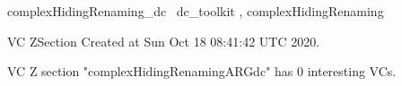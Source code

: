\documentclass{article}
\begin{document}

\begin{zsection}	 \SECTION complexHidingRenaming\_dc \parents~dc\_toolkit , complexHidingRenaming
\end{zsection}

\newcommand{\appliesTo}{\zbinop{appliesTo}} 
\newcommand{\appliesToNofix}{\zpreop{appliesToNofix}} 

VC ZSection Created at Sun Oct 18 08:41:42 UTC 2020.



 VC Z section "complexHidingRenamingARGdc" has $0$ interesting VCs.



\end{document}
